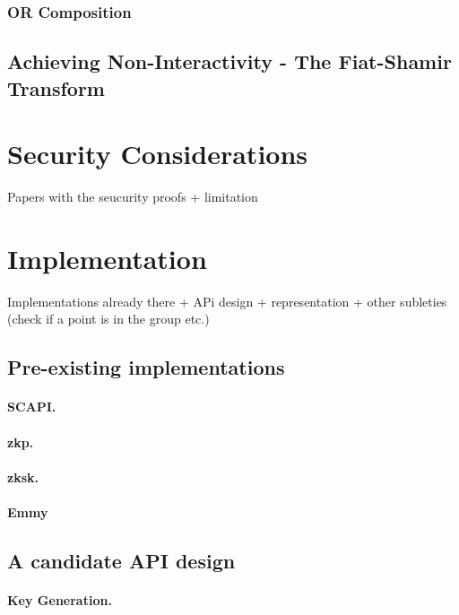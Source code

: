 \documentclass[runningheads]{llncs}
\begin{document}
\subsubsection{OR Composition}

\subsection{Achieving Non-Interactivity - The Fiat-Shamir Transform}


\section{Security Considerations}

Papers with the seucurity proofs + limitation

\section{Implementation}
Implementations already there + APi design + representation + other subleties (check if a point is in the group etc.)

\subsection{Pre-existing implementations}
\paragraph{SCAPI.}
\paragraph{zkp.}
\paragraph{zksk.}
\paragraph{Emmy}

\subsection{A candidate API design}

\paragraph{Key Generation.}
\end{document}
